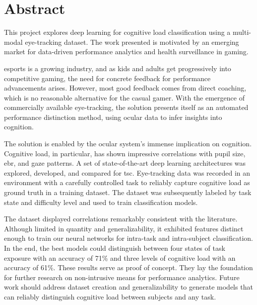 \chapter*{Abstract}

This project explores deep learning for cognitive load classification using a multi-modal eye-tracking dataset. The work presented is motivated by an emerging market for data-driven performance analytics and health surveillance in gaming.

\acrfull{esports} is a growing industry, and as kids and adults get progressively into competitive gaming, the need for concrete feedback for performance advancements arises. However, most good feedback comes from direct coaching, which is no reasonable alternative for the casual gamer. With the emergence of commercially available eye-tracking, the solution presents itself as an automated performance distinction method, using ocular data to infer insights into cognition. 


The solution is enabled by the ocular system's immense implication on cognition. Cognitive load, in particular, has shown impressive correlations with pupil size, \acrfull{ebr}, and gaze patterns. A set of state-of-the-art deep learning architectures was explored, developed, and compared for \acrfull{tsc}. Eye-tracking data was recorded in an environment with a carefully controlled task to reliably capture cognitive load as ground truth in a training dataset. The dataset was subsequently labeled by task state and difficulty level and used to train classification models.

The dataset displayed correlations remarkably consistent with the literature. Although limited in quantity and generalizability, it exhibited features distinct enough to train our neural networks for intra-task and intra-subject classification. In the end, the best models could distinguish between four states of task exposure with an accuracy of 71\% and three levels of cognitive load with an accuracy of 61\%. These results serve as proof of concept. They lay the foundation for further research on non-intrusive means for performance analytics. Future work should address dataset creation and generalizability to generate models that can reliably distinguish cognitive load between subjects and any task.